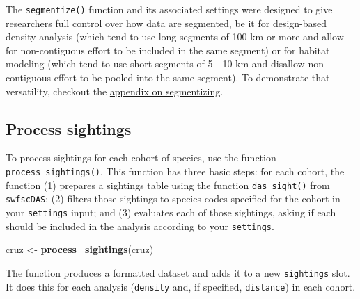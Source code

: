 \documentclass[
]{book}
\newenvironment{Shaded}{\begin{snugshade}}{\end{snugshade}}
\newcommand{\DecValTok}[1]{\textcolor[rgb]{0.00,0.00,0.81}{#1}}
\newcommand{\KeywordTok}[1]{\textcolor[rgb]{0.13,0.29,0.53}{\textbf{#1}}}
\newcommand{\NormalTok}[1]{#1}
\newcommand{\OperatorTok}[1]{\textcolor[rgb]{0.81,0.36,0.00}{\textbf{#1}}}
\newcommand{\StringTok}[1]{\textcolor[rgb]{0.31,0.60,0.02}{#1}}
\begin{document}
The \texttt{segmentize()} function and its associated settings were designed to give researchers full control over how data are segmented, be it for design-based density analysis (which tend to use long segments of 100 km or more and allow for non-contiguous effort to be included in the same segment) or for habitat modeling (which tend to use short segments of 5 - 10 km and disallow non-contiguous effort to be pooled into the same segment). To demonstrate that versatility, checkout the \protect\hyperlink{segmentizing}{appendix on segmentizing}.

\hypertarget{process-sightings}{%
\subsection*{Process sightings}\label{process-sightings}}

To process sightings for each cohort of species, use the function \texttt{process\_sightings()}. This function has three basic steps: for each cohort, the function (1) prepares a sightings table using the function \texttt{das\_sight()} from \texttt{swfscDAS}; (2) filters those sightings to species codes specified for the cohort in your \texttt{settings} input; and (3) evaluates each of those sightings, asking if each should be included in the analysis according to your \texttt{settings}.

\begin{Shaded}
\begin{Highlighting}[]
\NormalTok{cruz <-}\StringTok{ }\KeywordTok{process_sightings}\NormalTok{(cruz)}
\end{Highlighting}
\end{Shaded}

The function produces a formatted dataset and adds it to a new \texttt{sightings} slot. It does this for each analysis (\texttt{density} and, if specified, \texttt{distance}) in each cohort.

\begin{Shaded}
\end{Shaded}
\end{document}
